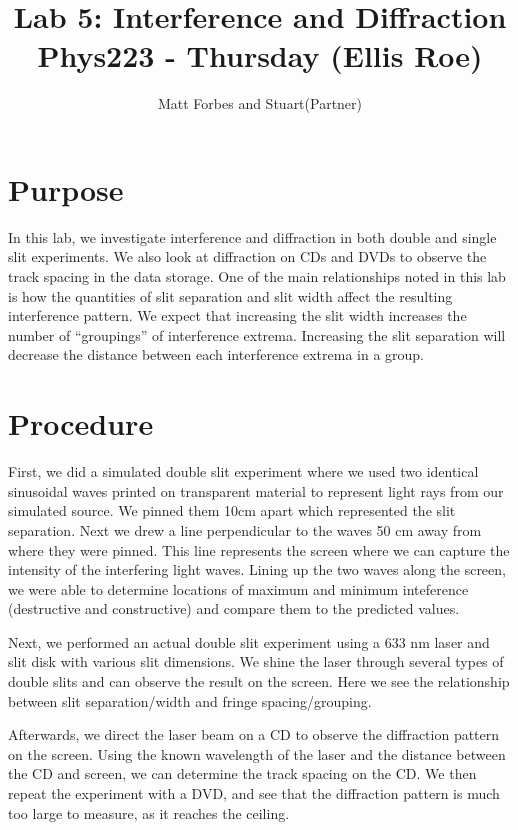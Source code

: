 \documentclass[12pt]{article}
\def \TITLE {Lab 5: Interference and Diffraction\\ Phys223 - Thursday (Ellis Roe)}
\begin{document}
\onecolumn
\title{\TITLE}
\author{Matt Forbes and Stuart(Partner)}
\maketitle

\twocolumn
\section*{Purpose}
In this lab, we investigate interference and diffraction in both
double and single slit experiments. We also look at diffraction on CDs
and DVDs to observe the track spacing in the data storage. One of the
main relationships noted in this lab is how the quantities of slit
separation and slit width affect the resulting interference
pattern. We expect that increasing the slit width increases the number
of ``groupings'' of interference extrema. Increasing the slit
separation will decrease the distance between each interference
extrema in a group.

\section*{Procedure}
First, we did a simulated double slit experiment where we used two
identical sinusoidal waves printed on transparent material to
represent light rays from our simulated source. We pinned them 10cm
apart which represented the slit separation. Next we drew a line
perpendicular to the waves 50 cm away from where they were
pinned. This line represents the screen where we can capture the
intensity of the interfering light waves. Lining up the two waves
along the screen, we were able to determine locations of maximum and
minimum inteference (destructive and constructive) and compare them to
the predicted values.

Next, we performed an actual double slit experiment using a 633 nm
laser and slit disk with various slit dimensions. We shine the laser
through several types of double slits and can observe the result on
the screen. Here we see the relationship between slit separation/width
and fringe spacing/grouping. 

Afterwards, we direct the laser beam on a CD to observe the
diffraction pattern on the screen. Using the known wavelength of the
laser and the distance between the CD and screen, we can determine the
track spacing on the CD. We then repeat the experiment with a DVD, and
see that the diffraction pattern is much too large to measure, as it
reaches the ceiling.
\end{document}
